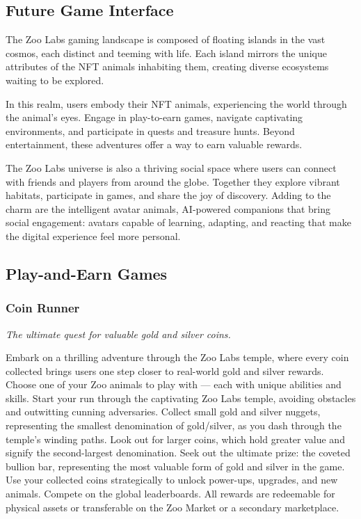 \subsection{Future Game Interface}

The Zoo Labs gaming landscape is composed of floating islands in the vast cosmos, each distinct and teeming with life. Each island mirrors the unique attributes of the NFT animals inhabiting them, creating diverse ecosystems waiting to be explored.

In this realm, users embody their NFT animals, experiencing the world through the animal's eyes. Engage in play-to-earn games, navigate captivating environments, and participate in quests and treasure hunts. Beyond entertainment, these adventures offer a way to earn valuable rewards.

The Zoo Labs universe is also a thriving social space where users can connect with friends and players from around the globe. Together they explore vibrant habitats, participate in games, and share the joy of discovery. Adding to the charm are the intelligent avatar animals, AI-powered companions that bring social engagement: avatars capable of learning, adapting, and reacting that make the digital experience feel more personal.

\subsection{Play-and-Earn Games}

\subsubsection{Coin Runner}

\textit{The ultimate quest for valuable gold and silver coins.}

Embark on a thrilling adventure through the Zoo Labs temple, where every coin collected brings users one step closer to real-world gold and silver rewards. Choose one of your Zoo animals to play with --- each with unique abilities and skills. Start your run through the captivating Zoo Labs temple, avoiding obstacles and outwitting cunning adversaries. Collect small gold and silver nuggets, representing the smallest denomination of gold/silver, as you dash through the temple's winding paths. Look out for larger coins, which hold greater value and signify the second-largest denomination. Seek out the ultimate prize: the coveted bullion bar, representing the most valuable form of gold and silver in the game. Use your collected coins strategically to unlock power-ups, upgrades, and new animals. Compete on the global leaderboards. All rewards are redeemable for physical assets or transferable on the Zoo Market or a secondary marketplace.

